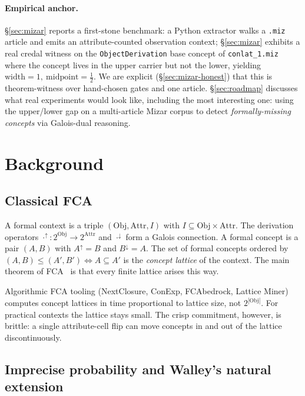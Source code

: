 \documentclass[]{article}
\newcommand{\lid}[1]{{\ttfamily\nolinkurl{#1}}}
\begin{document}
\paragraph{Empirical anchor.} \S\ref{sec:mizar} reports a first-stone benchmark: a
Python extractor walks a \lid{.miz} article and emits an attribute-counted
observation context; \S\ref{sec:mizar} exhibits a real credal witness on the
\lid{ObjectDerivation} base concept of \lid{conlat\_1.miz} where the concept lives in
the upper carrier but not the lower, yielding $\mathrm{width} = 1,\
\mathrm{midpoint} = \tfrac{1}{2}$. We are explicit (\S\ref{sec:mizar-honest}) that this
is theorem-witness over hand-chosen gates and one article. \S\ref{sec:roadmap}
discusses what real experiments would look like, including the most interesting one:
using the upper/lower gap on a multi-article Mizar corpus to detect
\emph{formally-missing concepts} via Galois-dual reasoning.

\section{Background}\label{sec:background}

\subsection{Classical FCA}\label{sec:bg-fca}

A formal context is a triple $(\mathrm{Obj}, \mathrm{Attr}, I)$ with
$I \subseteq \mathrm{Obj} \times \mathrm{Attr}$. The derivation operators
$\cdot^\uparrow : 2^{\mathrm{Obj}} \to 2^{\mathrm{Attr}}$ and
$\cdot^\downarrow$ form a Galois connection. A formal concept is a pair
$(A, B)$ with $A^\uparrow = B$ and $B^\downarrow = A$. The set of formal concepts
ordered by $(A, B) \leq (A', B') \iff A \subseteq A'$ is the
\emph{concept lattice} of the context. The main theorem of
FCA~\cite{wille1982,gantnerwille1999} is that every finite lattice arises this way.

Algorithmic FCA tooling (NextClosure, ConExp, FCAbedrock, Lattice Miner) computes
concept lattices in time proportional to lattice size, not $2^{|\mathrm{Obj}|}$.
For practical contexts the lattice stays small. The crisp commitment, however, is
brittle: a single attribute-cell flip can move concepts in and out of the lattice
discontinuously.

\subsection{Imprecise probability and Walley's natural extension}\label{sec:bg-walley}
\end{document}
